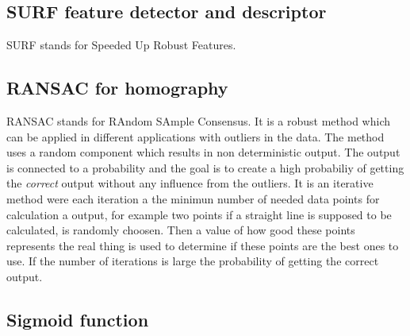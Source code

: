 \subsection{SURF feature detector and descriptor}
SURF stands for Speeded Up Robust Features.

\subsection{RANSAC for homography}
RANSAC stands for RAndom SAmple Consensus. It is a robust method which can be applied in different applications with outliers in the data. The method uses a random component which results in non deterministic output. The output is connected to a probability and the goal is to create a high probabiliy of getting the {\it correct} output without any influence from the outliers. It is an iterative method were each iteration a the minimun number of needed data points for calculation a output, for example two points if a straight line is supposed to be calculated, is randomly choosen. Then a value of how good these points represents the real thing is used to determine if these points are the best ones to use. If the number of iterations is large the probability of getting the correct output.

\subsection{Sigmoid function}

